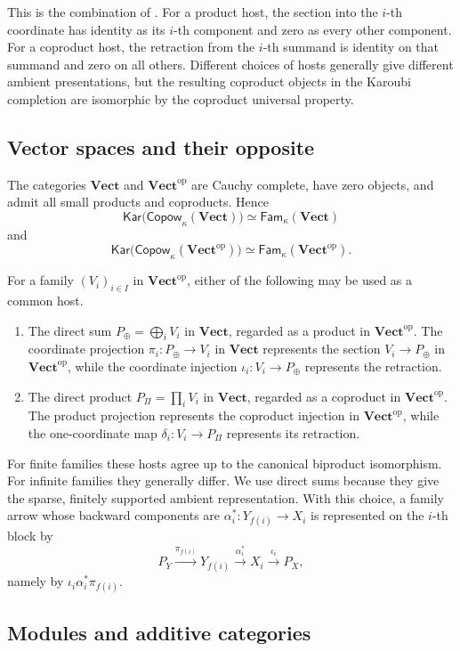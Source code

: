 \documentclass[runningheads,envcountsame]{llncs}
\newcommand{\Vect}{\mathbf{Vect}}
\newcommand{\Vectop}{\mathbf{Vect}^{\mathrm{op}}}
\newcommand{\Copow}{\mathsf{Copow}}
\newcommand{\Fam}{\mathsf{Fam}}
\newcommand{\Kar}{\mathsf{Kar}}
\begin{document}
This is the combination of
.
For a product host, the section into the $i$-th coordinate has identity as its
$i$-th component and zero as every other component. For a coproduct host, the
retraction from the $i$-th summand is identity on that summand and zero on all
others. Different choices of hosts generally give different ambient
presentations, but the resulting coproduct objects in the Karoubi completion
are isomorphic by the coproduct universal property.

\subsection{Vector spaces and their opposite}

The categories $\Vect$ and $\Vectop$ are Cauchy complete, have zero objects,
and admit all small products and coproducts. Hence
$$
\Kar\bigl(\Copow_\kappa(\Vect)\bigr)
\simeq
\Fam_\kappa(\Vect)
$$
and
$$
\Kar\bigl(\Copow_\kappa(\Vectop)\bigr)
\simeq
\Fam_\kappa(\Vectop).
$$

For a family $(V_i)_{i\in I}$ in $\Vectop$, either of the following may be
used as a common host.
\begin{enumerate}
\item The direct sum $P_\oplus=\bigoplus_iV_i$ in $\Vect$, regarded as
a product in $\Vectop$. The coordinate projection
$\pi_i:P_\oplus\to V_i$ in $\Vect$ represents the section
$V_i\to P_\oplus$ in $\Vectop$, while the coordinate injection
$\iota_i:V_i\to P_\oplus$ represents the retraction.
\item The direct product $P_\Pi=\prod_iV_i$ in $\Vect$, regarded as a
coproduct in $\Vectop$. The product projection represents the coproduct
injection in $\Vectop$, while the one-coordinate map
$\delta_i:V_i\to P_\Pi$ represents its retraction.
\end{enumerate}
For finite families these hosts agree up to the canonical biproduct
isomorphism. For infinite families they generally differ. We use direct sums
because they give the sparse, finitely supported ambient representation. With
this choice, a family arrow whose backward components are
$\alpha_i^*:Y_{f(i)}\to X_i$ is represented on the $i$-th block by
$$
P_Y
\xrightarrow{\pi_{f(i)}}
Y_{f(i)}
\xrightarrow{\alpha_i^*}
X_i
\xrightarrow{\iota_i}
P_X,
$$
namely by $\iota_i\alpha_i^*\pi_{f(i)}$.

\subsection{Modules and additive categories}
\end{document}
